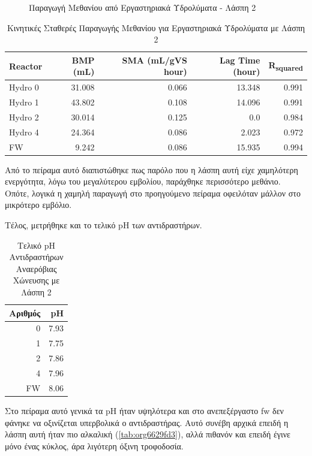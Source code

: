 \documentclass[11pt]{report}
\begin{document}
\begin{enumerate}
\begin{figure}[htbp]
\centering

\caption{\label{fig:org7caa946}Παραγωγή Μεθανίου από Εργαστηριακά Υδρολύματα - Λάσπη 2}
\end{figure}

\begin{table}[htbp]
\caption{\label{tab:org893553a}Κινητικές Σταθερές Παραγωγής Μεθανίου για Εργαστηριακά Υδρολύματα με Λάσπη 2}
\centering
\begin{tabular}{lrrrr}
Reactor & BMP (mL) & SMA (mL/gVS hour) & Lag Time (hour) & R\textsubscript{squared}\\[0pt]
\hline
Hydro 0 & 31.008 & 0.066 & 13.348 & 0.991\\[0pt]
Hydro 1 & 43.802 & 0.108 & 14.096 & 0.991\\[0pt]
Hydro 2 & 30.014 & 0.125 & 0.0 & 0.984\\[0pt]
Hydro 4 & 24.364 & 0.086 & 2.023 & 0.972\\[0pt]
FW & 9.242 & 0.086 & 15.935 & 0.994\\[0pt]
\end{tabular}
\end{table}

Από το πείραμα αυτό διαπιστώθηκε πως παρόλο που η λάσπη αυτή είχε χαμηλότερη ενεργότητα, λόγω του μεγαλύτερου εμβολίου, παράχθηκε περισσότερο μεθάνιο. Οπότε, λογικά η χαμηλή παραγωγή στο προηγούμενο πείραμα οφειλόταν μάλλον στο μικρότερο εμβόλιο.

Τέλος, μετρήθηκε και το τελικό pH των αντιδραστήρων.

\begin{table}[htbp]
\caption{\label{tab:org1c55b32}Τελικό pH Αντιδραστήρων Αναερόβιας Χώνευσης με Λάσπη 2}
\centering
\begin{tabular}{rr}
Αριθμός & pH\\[0pt]
\hline
0 & 7.93\\[0pt]
1 & 7.75\\[0pt]
2 & 7.86\\[0pt]
4 & 7.96\\[0pt]
FW & 8.06\\[0pt]
\end{tabular}
\end{table}

Στο πείραμα αυτό γενικά τα pH ήταν υψηλότερα και στο ανεπεξέργαστο \acrshort{fw} δεν φάνηκε να οξινίζεται υπερβολικά ο αντιδραστήρας. Αυτό συνέβη αρχικά επειδή η λάσπη αυτή ήταν πιο αλκαλική (\ref{tab:org6629fd3}), αλλά πιθανόν και επειδή έγινε μόνο ένας κύκλος, άρα λιγότερη όξινη τροφοδοσία.


\end{enumerate}
\end{document}
